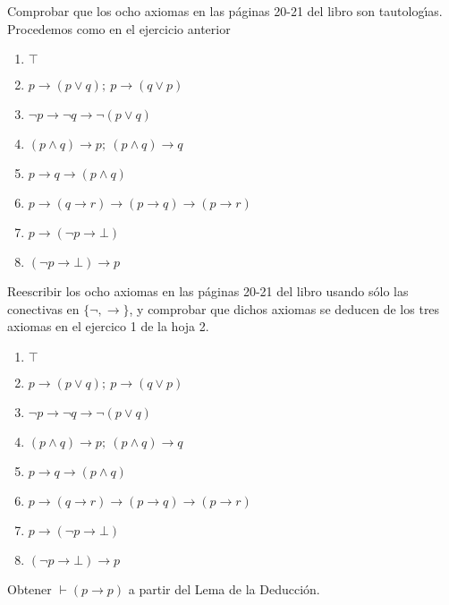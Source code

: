 \begin{problem}[7]
Comprobar que los ocho axiomas en las p\'aginas 20-21 del libro son tautolog\'{\i}as.
\solution
Procedemos como en el ejercicio anterior
\begin{enumerate}
\item \textbf{$\top$}
\item \textbf{$p → (p ∨ q); \  p → (q ∨ p)$}

\item \textbf{$¬p → ¬q → ¬(p ∨ q)$}

\item \textbf{$(p ∧ q) → p; \ (p ∧ q) → q$}


\item \textbf{$p → q → (p ∧ q)$}

\item \textbf{$p → (q → r) → (p → q) → (p → r)$}
\item \textbf{$p → (¬p → ⊥)$}
\item \textbf{$(¬p → ⊥) → p$}

\end{enumerate}
\end{problem}



\begin{problem}[8]
Reescribir  los ocho axiomas en las p\'aginas 20-21 del libro
usando s\'olo las conectivas en $\{\neg, \to\}$,  y  comprobar que dichos axiomas
se deducen de los   tres axiomas en el ejercico 1 de la hoja 2.
\solution

\begin{enumerate}
\item \textbf{$\top$}
\item \textbf{$p → (p ∨ q); \  p → (q ∨ p)$}

\item \textbf{$¬p → ¬q → ¬(p ∨ q)$}

\item \textbf{$(p ∧ q) → p; \ (p ∧ q) → q$}


\item \textbf{$p → q → (p ∧ q)$}

\item \textbf{$p → (q → r) → (p → q) → (p → r)$}
\item \textbf{$p → (¬p → ⊥)$}
\item \textbf{$(¬p → ⊥) → p$}

\end{enumerate}
\end{problem}

\begin{problem}[9]
Obtener $\vdash (p\to p)$ a partir del Lema de la Deducci\'on.
\solution

\end{problem}

